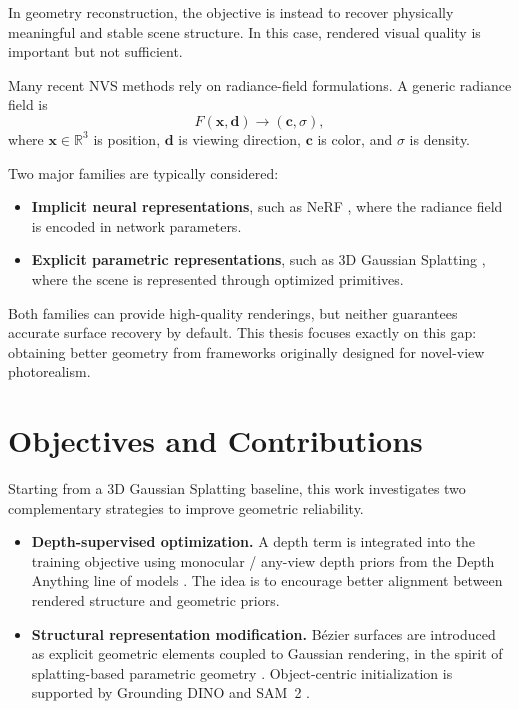 In geometry reconstruction, the objective is instead to recover physically meaningful and stable scene structure. In this case, rendered visual quality is important but not sufficient.

Many recent NVS methods rely on radiance-field formulations. A generic radiance field is
\[
F(\mathbf{x}, \mathbf{d}) \rightarrow (\mathbf{c}, \sigma),
\]
where $\mathbf{x}\in\mathbb{R}^3$ is position, $\mathbf{d}$ is viewing direction, $\mathbf{c}$ is color, and $\sigma$ is density.

Two major families are typically considered:
\begin{itemize}
    \item \textbf{Implicit neural representations}, such as NeRF \cite{mildenhall2020nerf}, where the radiance field is encoded in network parameters.
    \item \textbf{Explicit parametric representations}, such as 3D Gaussian Splatting \cite{kerbl2023gaussian}, where the scene is represented through optimized primitives.
\end{itemize}

Both families can provide high-quality renderings, but neither guarantees accurate surface recovery by default. This thesis focuses exactly on this gap: obtaining better geometry from frameworks originally designed for novel-view photorealism.

\section{Objectives and Contributions}
Starting from a 3D Gaussian Splatting baseline, this work investigates two complementary strategies to improve geometric reliability.
\begin{itemize}
    \item \textbf{Depth-supervised optimization.} A depth term is integrated into the training objective using monocular / any-view depth priors from the Depth Anything line of models \cite{yang2024depth,yang2024depthanythingv2,lin2025depthanything3}. The idea is to encourage better alignment between rendered structure and geometric priors.
    \item \textbf{Structural representation modification.} B\'ezier surfaces are introduced as explicit geometric elements coupled to Gaussian rendering, in the spirit of splatting-based parametric geometry \cite{liu2025bezier,kerbl2023gaussian}. Object-centric initialization is supported by Grounding DINO \cite{liu2023groundingdino} and SAM~2 \cite{ravi2024sam2}.
\end{itemize}

